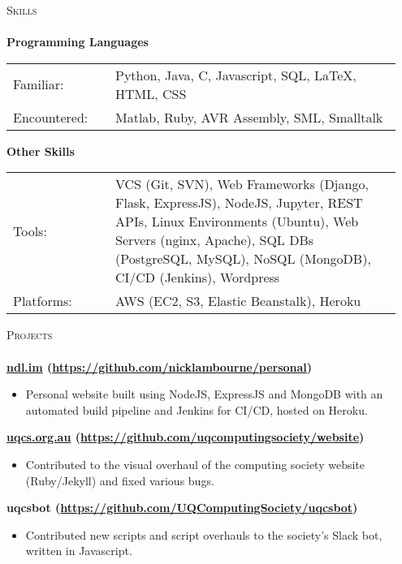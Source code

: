 \documentclass[a4paper]{article}
\newcommand{\lineunder} {
    \vspace*{-8pt} \\
    \hspace*{-18pt} \hrulefill \\
}
\newcommand{\header} [1] {
    {\hspace*{-18pt}\vspace*{6pt} \textsc{#1}}
    \vspace*{-6pt} \lineunder
}
\newenvironment{singleitem}
{   \small
    \vspace{-2.6pt}
    \begin{itemize}
    \setlength{\itemsep}{0pt}
    \setlength{\parskip}{0pt}
    \setlength{\parsep}{0pt}   }
{\end{itemize} \vspace{-2.6pt}	}
\begin{document}
\vspace{-1mm}
\header{Skills}
\textbf{Programming Languages}
\begin{tabular}{p{0.25\linewidth}p{0.7\linewidth}}
	\small Familiar: & \small Python, Java, C, Javascript, SQL, \LaTeX, HTML, CSS \\
	\small Encountered: & \small Matlab, Ruby, AVR Assembly, SML, Smalltalk   \\
\end{tabular}
\textbf{Other Skills}
\begin{tabular}{p{0.25\linewidth}p{0.7\linewidth}}
	\small Tools: & \small VCS (Git, SVN), Web Frameworks (Django, Flask, ExpressJS), NodeJS,  Jupyter, REST APIs, Linux Environments (Ubuntu), Web Servers (nginx, Apache), SQL DBs (PostgreSQL, MySQL), NoSQL (MongoDB), CI/CD (Jenkins), Wordpress \\
	\small Platforms: & \small AWS (EC2, S3, Elastic Beanstalk), Heroku  \\
\end{tabular}

\vspace{1mm}


\vspace{1mm}

\header{Projects}
\vspace{1mm}
\textbf{\href{https://ndl.im}{ndl.im} (\href{https://github.com/nicklambourne/personal}{https://github.com/nicklambourne/personal})}
\begin{singleitem}
	\item Personal website built using NodeJS, ExpressJS and MongoDB with an automated build pipeline and Jenkins for CI/CD, hosted on Heroku.
\end{singleitem}

\textbf{\href{https://uqcs.org.au}{uqcs.org.au} (\href{https://github.com/uqcomputingsociety/website}{https://github.com/uqcomputingsociety/website})}
\begin{singleitem}
	\item Contributed to the visual overhaul of the computing society website (Ruby/Jekyll) and fixed various bugs.
\end{singleitem}

\textbf{uqcsbot (\href{https://github.com/UQComputingSociety/uqcsbot}{https://github.com/UQComputingSociety/uqcsbot})}
\begin{singleitem}
	\item Contributed new scripts and script overhauls to the society's Slack bot, written in Javascript.
\end{singleitem}
\end{document}
